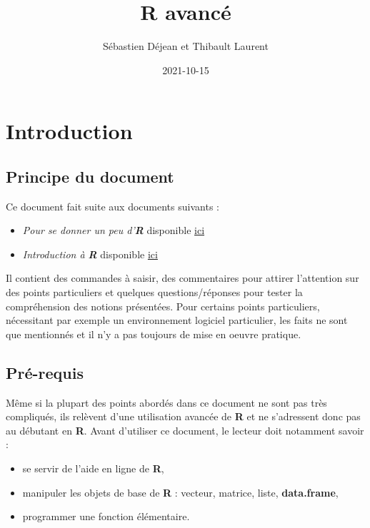 \documentclass[
]{book}
\title{R avancé}
\author{Sébastien Déjean et Thibault Laurent}
\date{2021-10-15}
\theoremstyle{definition}
\theoremstyle{definition}
\theoremstyle{definition}
\theoremstyle{definition}
\theoremstyle{remark}
\begin{document}
\maketitle

{
\setcounter{tocdepth}{1}
\tableofcontents
}
\hypertarget{introduction}{%
\chapter{Introduction}\label{introduction}}

\hypertarget{principe-du-document}{%
\section{Principe du document}\label{principe-du-document}}

Ce document fait suite aux documents suivants :

\begin{itemize}
\item
  \emph{Pour se donner un peu d'\textbf{R}} disponible \href{https://www.math.univ-toulouse.fr/~sdejean/PDF/un-peu-d-R.pdf}{ici}
\item
  \emph{Introduction à \textbf{R}} disponible \href{http://www.thibault.laurent.free.fr/cours/R_intro/}{ici}
\end{itemize}

Il contient des commandes à saisir, des commentaires pour attirer l'attention sur des points particuliers et quelques questions/réponses pour tester la compréhension des notions présentées. Pour certains points particuliers, nécessitant par exemple un environnement logiciel particulier, les faits ne sont que mentionnés et il n'y a pas toujours de mise en oeuvre pratique.

\hypertarget{pruxe9-requis}{%
\section{Pré-requis}\label{pruxe9-requis}}

Même si la plupart des points abordés dans ce document ne sont pas très compliqués, ils relèvent d'une utilisation avancée de \textbf{R} et ne s'adressent donc pas au débutant en \textbf{R}. Avant d'utiliser ce document, le lecteur doit notamment savoir :

\begin{itemize}
\item
  se servir de l'aide en ligne de \textbf{R},
\item
  manipuler les objets de base de \textbf{R} : vecteur, matrice, liste, \textbf{data.frame},
\item
  programmer une fonction élémentaire.
\end{itemize}
\end{document}
